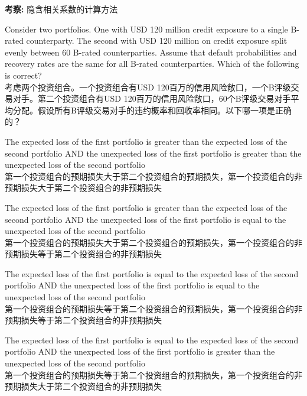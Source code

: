 \documentclass{article}
\newcounter{question} %
\newcommand{\checklist}[1]{
    \textbf{考察:} #1 \par %
    \addcontentsline{toc}{subsection}{题号\thequestion 考察: #1} %
    \vspace{2em} %
}
\begin{document}
\checklist{隐含相关系数的计算方法}

\begin{question}
    Consider two portfolios. One with USD 120 million credit exposure to a single B-rated counterparty. The second with USD 120 million on credit exposure split evenly between 60 B-rated counterparties. Assume that default probabilities and recovery rates are the same for all B-rated counterparties. Which of the following is correct?
    \\ 考虑两个投资组合。一个投资组合有USD 120百万的信用风险敞口，一个B评级交易对手。第二个投资组合有USD 120百万的信用风险敞口，60个B评级交易对手平均分配。假设所有B评级交易对手的违约概率和回收率相同。以下哪一项是正确的？
\end{question}

\begin{choices}
    \item The expected loss of the first portfolio is greater than the expected loss of the second portfolio AND the unexpected loss of the first portfolio is greater than the unexpected loss of the second portfolio\\
    第一个投资组合的预期损失大于第二个投资组合的预期损失，第一个投资组合的非预期损失大于第二个投资组合的非预期损失
    \item The expected loss of the first portfolio is greater than the expected loss of the second portfolio AND the unexpected loss of the first portfolio is equal to the unexpected loss of the second portfolio\\
    第一个投资组合的预期损失大于第二个投资组合的预期损失，第一个投资组合的非预期损失等于第二个投资组合的非预期损失
    \item The expected loss of the first portfolio is equal to the expected loss of the second portfolio AND the unexpected loss of the first portfolio is equal to the unexpected loss of the second portfolio\\
    第一个投资组合的预期损失等于第二个投资组合的预期损失，第一个投资组合的非预期损失等于第二个投资组合的非预期损失
    \item The expected loss of the first portfolio is equal to the expected loss of the second portfolio AND the unexpected loss of the first portfolio is greater than the unexpected loss of the second portfolio\\
    第一个投资组合的预期损失等于第二个投资组合的预期损失，第一个投资组合的非预期损失大于第二个投资组合的非预期损失
\end{choices}
\end{document}

